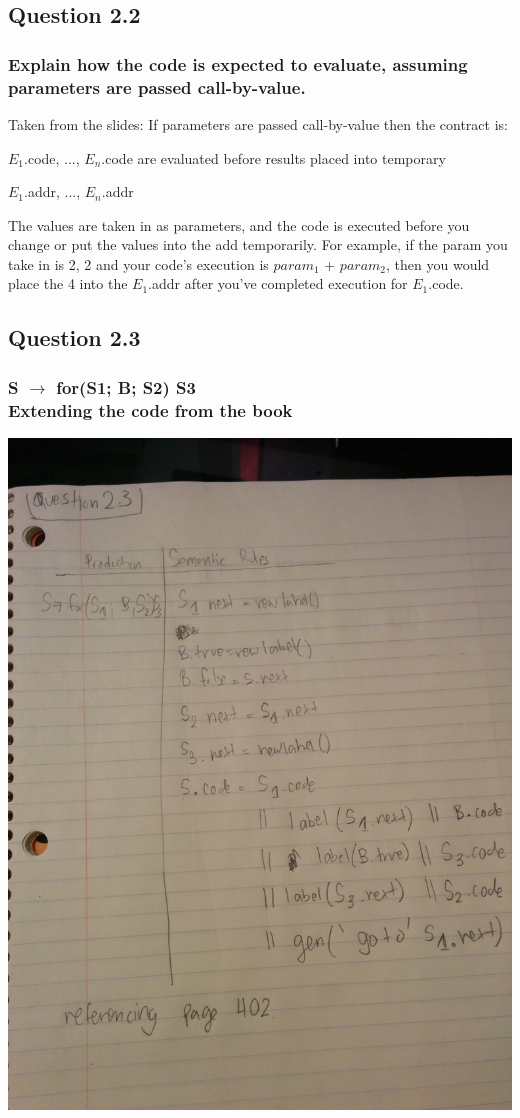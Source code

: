 \documentclass[11pt, oneside]{article}   	%
\begin{document}
\subsection{Question 2.2}
\subsubsection{Explain how the code is expected to evaluate, assuming parameters are passed call-by-value.}
\par Taken from the slides: If parameters are passed call-by-value then the contract is: 
\par $E_1$.code, ..., $E_n$.code are evaluated before results placed into temporary 
\par $E_1$.addr, ..., $E_n$.addr
\par \noindent The values are taken in as parameters, and the code is executed before you change or put the values into the add temporarily. For example, if the param you take in is 2, 2 and your code's execution is $param_1$ + $param_2$, then you would place the 4 into the $E_1$.addr after you've completed execution for $E_1$.code.

\subsection{Question 2.3}
\subsubsection{S $\rightarrow$ for(S1; B; S2) S3 \\ Extending the code from the book}
\includegraphics[scale=0.12]{IMG_20141029_014044.jpg}
\end{document}
